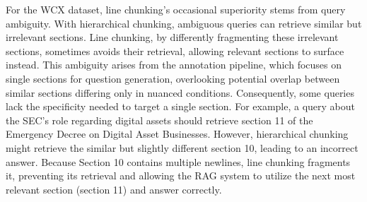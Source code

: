 
For the WCX dataset, line chunking's occasional superiority stems from query ambiguity. With hierarchical chunking, ambiguous queries can retrieve similar but irrelevant sections. Line chunking, by differently fragmenting these irrelevant sections, sometimes avoids their retrieval, allowing relevant sections to surface instead. This ambiguity arises from the annotation pipeline, which focuses on single sections for question generation, overlooking potential overlap between similar sections differing only in nuanced conditions. Consequently, some queries lack the specificity needed to target a single section. For example, a query about the SEC's role regarding digital assets should retrieve section 11 of the Emergency Decree on Digital Asset Businesses. However, hierarchical chunking might retrieve the similar but slightly different section 10, leading to an incorrect answer. Because Section 10 contains multiple newlines, line chunking fragments it, preventing its retrieval and allowing the RAG system to utilize the next most relevant section (section 11) and answer correctly.

